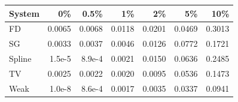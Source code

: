 \begin{tabular}{lrrrrrr}\toprule
System & 0\% & 0.5\% & 1\% & 2\% & 5\% & 10\% \\\midrule
FD & 0.0065 & 0.0068 & 0.0118 & 0.0201 & 0.0469 & 0.3013 \\
SG & 0.0033 & 0.0037 & 0.0046 & 0.0126 & 0.0772 & 0.1721 \\
Spline & 1.5e-5 & 8.9e-4 & 0.0021 & 0.0150 & 0.0636 & 0.2485 \\
TV & 0.0025 & 0.0022 & 0.0020 & 0.0095 & 0.0536 & 0.1473 \\
Weak & 1.0e-8 & 8.6e-4 & 0.0017 & 0.0035 & 0.0337 & 0.0941 \\
\bottomrule\end{tabular}
